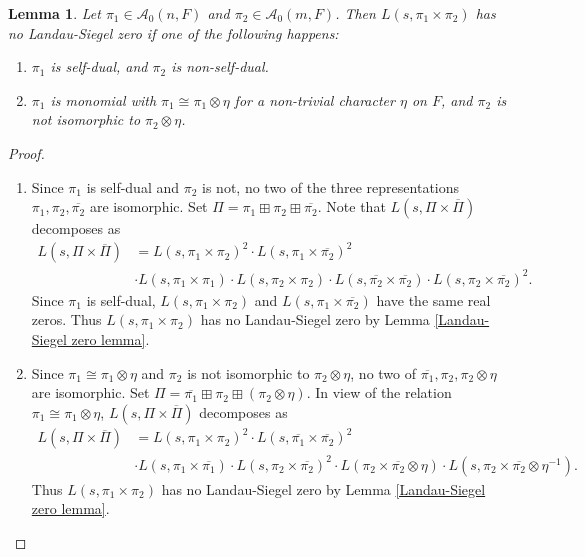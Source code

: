 \documentclass[10pt,a4paper]{amsart}
\newtheorem{lemma}{Lemma}
\newcommand{\cA}{\mathcal{A}}
\newcommand{\ov}{\overline}
\begin{document}
\begin{lemma}\label{new Rankin-Selberg Landau-Siegel zero}
    Let $\pi_1 \in \cA_0(n,F)$ and $\pi_2 \in \cA_0(m,F)$. Then $L(s,\pi_1 \times \pi_2)$ has no Landau-Siegel zero if one of the following happens:
    \begin{enumerate}
        \item $\pi_1$ is self-dual, and $\pi_2$ is non-self-dual. 
        \item $\pi_1$ is monomial with $\pi_1 \cong \pi_1 \otimes \eta$ for a non-trivial character $\eta$ on $F$, and $\pi_2$ is not isomorphic to $\pi_2 \otimes \eta$.
    \end{enumerate}
\end{lemma}

\begin{proof}
    \begin{enumerate}
        \item Since $\pi_1$ is self-dual and $\pi_2$ is not, no two of the three representations $\pi_1,\pi_2, \ov{\pi_2}$ are isomorphic. Set $\Pi = \pi_1 \boxplus \pi_2 \boxplus \ov{\pi_2}$. Note that $L(s,\Pi \times \ov{\Pi})$ decomposes as 
        \begin{align*}
            L(s,\Pi \times \ov{\Pi}) &= L(s,\pi_1 \times \pi_2)^2 \cdot L(s,\pi_1 \times \ov{\pi_2})^2 \\
            &\cdot L(s,\pi_1 \times \pi_1) \cdot L(s,\pi_2 \times \pi_2) \cdot L(s,\ov{\pi_2} \times \ov{\pi_2}) \cdot L(s,\pi_2 \times \ov{\pi_2})^2.
        \end{align*}
        Since $\pi_1$ is self-dual, $L(s,\pi_1 \times \pi_2)$ and $L(s,\pi_1 \times \ov{\pi_2})$ have the same real zeros. Thus $L(s,\pi_1 \times \pi_2)$ has no Landau-Siegel zero by Lemma \ref{Landau-Siegel zero lemma}.
        \item Since $\pi_1 \cong \pi_1 \otimes \eta$ and $\pi_2$ is not isomorphic to $\pi_2 \otimes \eta$, no two of $\ov{\pi_1},\pi_2,\pi_2 \otimes \eta$ are isomorphic. Set $\Pi = \ov{\pi_1} \boxplus \pi_2 \boxplus (\pi_2 \otimes \eta)$. In view of the relation $\pi_1 \cong \pi_1 \otimes \eta$, $L(s,\Pi \times \ov{\Pi})$ decomposes as 
        \begin{align*}
            L(s,\Pi \times \ov{\Pi}) &= L(s,\pi_1 \times \pi_2)^2 \cdot L(s,\ov{\pi_1} \times \ov{\pi_2})^2 \\
            &\cdot L(s,\pi_1 \times \ov{\pi_1}) \cdot L(s,\pi_2 \times \ov{\pi_2})^2 \cdot L(\pi_2 \times \ov{\pi_2} \otimes \eta) \cdot L(s,\pi_2 \times \ov{\pi_2} \otimes \eta^{-1}).
        \end{align*}
        Thus $L(s,\pi_1 \times \pi_2)$ has no Landau-Siegel zero by Lemma \ref{Landau-Siegel zero lemma}.
    \end{enumerate}
\end{proof}
\end{document}
